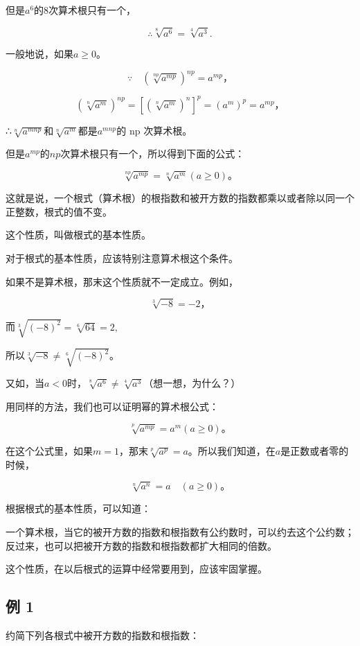 但是\(a^6\)的8次算术根只有一个，

\[
\therefore \sqrt[8]{a ^ {6}} = \sqrt[4]{a ^ {3}}.
\]

一般地说，如果\(a \geqslant 0\)。

\[
\because \quad \left(\sqrt[n p]{a ^ {m p}}\right) ^ {n p} = a ^ {m p}\text{，}
\]

\[
(\sqrt[n]{a ^ {m}}) ^ {n p} = [ (\sqrt[n]{a ^ {m}}) ^ {n} ] ^ {p} = (a ^ {m}) ^ {p} = a ^ {m p}\text{，}
\]

∴\(\sqrt[n]{a^{mnp}}\)和\(\sqrt[n]{a^{m}}\)都是\(a^{mnp}\)的 np
次算术根。

但是\(a^{mp}\)的\(np\)次算术根只有一个，所以得到下面的公式：

\[
\sqrt[n p]{a ^ {m p}} = \sqrt[n]{a ^ {m}} (a \geqslant 0)\text{。}
\]

这就是说，一个根式（算术根）的根指数和被开方数的指数都乘以或者除以同一个正整数，根式的值不变。

这个性质，叫做根式的基本性质。

对于根式的基本性质，应该特别注意算术根这个条件。

如果不是算术根，那末这个性质就不一定成立。例如，

\[
\sqrt[3]{- 8} = - 2\text{，}
\]

而\(\sqrt[3]{(-8)^2} = \sqrt[6]{64} = 2,\)

所以\(\sqrt[3]{-8} \neq \sqrt[6]{(-8)^2}\)。

又如，当\(a < 0\)时，\(\sqrt[8]{a^6} \neq \sqrt[4]{a^3}\)（想一想，为什么？）

用同样的方法，我们也可以证明幂的算术根公式：

\[
\sqrt[p]{a ^ {m p}} = a ^ {m} (a \geqslant 0)\text{。}
\]

在这个公式里，如果\(m = 1\)，那末\(\sqrt[p]{a^p} = a\)。所以我们知道，在\(a\)是正数或者零的时候，

\[
\sqrt[n]{a ^ {n}} = a \quad (a \geqslant 0)\text{。}
\]

根据根式的基本性质，可以知道：

一个算术根，当它的被开方数的指数和根指数有公约数时，可以约去这个公约数；反过来，也可以把被开方数的指数和根指数都扩大相同的倍数。

这个性质，在以后根式的运算中经常要用到，应该牢固掌握。

\subsection{例 1}

约简下列各根式中被开方数的指数和根指数：

